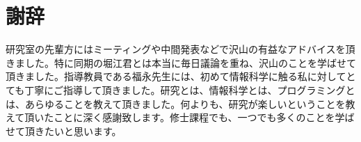 \documentclass{jsarticle}
\begin{document}
\section{謝辞}

研究室の先輩方にはミーティングや中間発表などで沢山の有益なアドバイスを頂きました。特に同期の堀江君とは本当に毎日議論を重ね、沢山のことを学ばせて頂きました。指導教員である福永先生には、初めて情報科学に触る私に対してとても丁寧にご指導して頂きました。研究とは、情報科学とは、プログラミングとは、あらゆることを教えて頂きました。何よりも、研究が楽しいということを教えて頂いたことに深く感謝致します。修士課程でも、一つでも多くのことを学ばせて頂きたいと思います。



\end{document}
